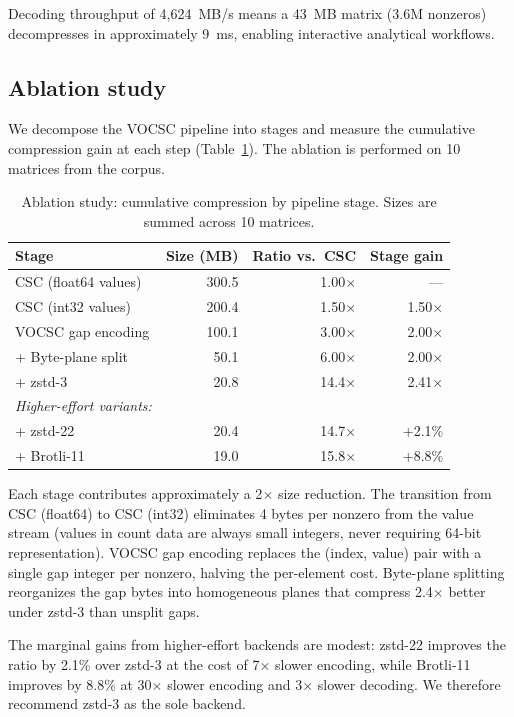 \documentclass[10pt,twocolumn,letterpaper]{article}
\begin{document}
Decoding throughput of 4,624~MB/s means a 43~MB matrix (3.6M nonzeros) decompresses in approximately 9~ms, enabling interactive analytical workflows.

\subsection{Ablation study}
\label{sec:ablation}

We decompose the VOCSC pipeline into stages and measure the cumulative compression gain at each step (Table~\ref{tab:ablation}).
The ablation is performed on 10 matrices from the corpus.

\begin{table}[t]
\centering
\caption{Ablation study: cumulative compression by pipeline stage. Sizes are summed across 10 matrices.}
\label{tab:ablation}
\footnotesize
\begin{tabular}{lrrr}
\toprule
Stage & Size (MB) & Ratio vs.\ CSC & Stage gain \\
\midrule
CSC (float64 values)     & 300.5 & 1.00$\times$ & --- \\
CSC (int32 values)       & 200.4 & 1.50$\times$ & 1.50$\times$ \\
VOCSC gap encoding       & 100.1 & 3.00$\times$ & 2.00$\times$ \\
+ Byte-plane split       &  50.1 & 6.00$\times$ & 2.00$\times$ \\
+ zstd-3                 &  20.8 & 14.4$\times$ & 2.41$\times$ \\
\midrule
\emph{Higher-effort variants:} & & & \\
\quad + zstd-22          &  20.4 & 14.7$\times$ & +2.1\% \\
\quad + Brotli-11        &  19.0 & 15.8$\times$ & +8.8\% \\
\bottomrule
\end{tabular}
\end{table}

Each stage contributes approximately a 2$\times$ size reduction.
The transition from CSC (float64) to CSC (int32) eliminates 4 bytes per nonzero from the value stream (values in count data are always small integers, never requiring 64-bit representation).
VOCSC gap encoding replaces the (index, value) pair with a single gap integer per nonzero, halving the per-element cost.
Byte-plane splitting reorganizes the gap bytes into homogeneous planes that compress 2.4$\times$ better under zstd-3 than unsplit gaps.

The marginal gains from higher-effort backends are modest: zstd-22 improves the ratio by 2.1\% over zstd-3 at the cost of 7$\times$ slower encoding, while Brotli-11 improves by 8.8\% at 30$\times$ slower encoding and 3$\times$ slower decoding.
We therefore recommend zstd-3 as the sole backend.
\end{document}
